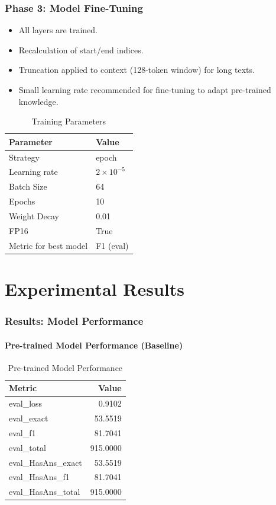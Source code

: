 \documentclass{beamer}
\begin{document}
\begin{frame}
    \frametitle{Phase 3: Model Fine-Tuning}
    \begin{itemize}
        \item All layers are trained.
        \item Recalculation of start/end indices.
        \item Truncation applied to context (128-token window) for long texts.
        \item Small learning rate recommended for fine-tuning to adapt pre-trained knowledge.
    \end{itemize}
    \begin{table}[htbp]
    \caption{Training Parameters}
    \centering
    \small
    \begin{tabular}{ll}
      \toprule
    Parameter & Value\\
    \midrule
    Strategy & epoch\\
    Learning rate & $2 \times 10^{-5}$\\
    Batch Size & 64\\
    Epochs & 10\\
    Weight Decay & 0.01\\
    FP16 & True\\
      Metric for best model & F1 (eval)\\
      \bottomrule
    \end{tabular}
    \end{table}
\end{frame}

\section{Experimental Results}
\label{sec:experimental-results}


\begin{frame}
    \frametitle{Results: Model Performance}
    \framesubtitle{Pre-trained Model Performance (Baseline)}
    \begin{table}[h]
      \centering
      \small
      \caption{Pre-trained Model Performance}
      \label{tab:before-performance-slide}
      \begin{tabular}{lr}
    \toprule
    Metric & Value \\
    \midrule
    eval\_loss & 0.9102 \\
    eval\_exact & 53.5519 \\
    eval\_f1 & 81.7041 \\
    eval\_total & 915.0000 \\
    eval\_HasAns\_exact & 53.5519 \\
    eval\_HasAns\_f1 & 81.7041 \\
    eval\_HasAns\_total & 915.0000 \\
    \bottomrule
    \end{tabular}
    \end{table}
\end{frame}
\end{document}
